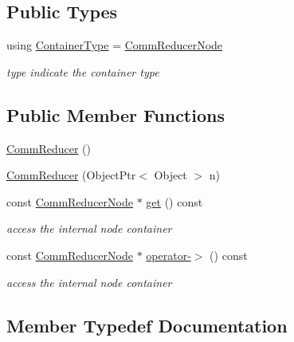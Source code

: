 \subsection*{Public Types}
\begin{DoxyCompactItemize}
\item 
using \hyperlink{classtvm_1_1tir_1_1CommReducer_af3d55a2dcd9c4ecc28145d1c5e00ec2c}{Container\+Type} = \hyperlink{classtvm_1_1tir_1_1CommReducerNode}{Comm\+Reducer\+Node}
\begin{DoxyCompactList}\small\item\em type indicate the container type \end{DoxyCompactList}\end{DoxyCompactItemize}
\subsection*{Public Member Functions}
\begin{DoxyCompactItemize}
\item 
\hyperlink{classtvm_1_1tir_1_1CommReducer_a1a1d6de9090785185ed42446a4374614}{Comm\+Reducer} ()
\item 
\hyperlink{classtvm_1_1tir_1_1CommReducer_a9af1549787e4a3971ab494c56b8fe97c}{Comm\+Reducer} (Object\+Ptr$<$ Object $>$ n)
\item 
const \hyperlink{classtvm_1_1tir_1_1CommReducerNode}{Comm\+Reducer\+Node} $\ast$ \hyperlink{classtvm_1_1tir_1_1CommReducer_a4c69b3e99208dc2b59a2d7ea9a14f98a}{get} () const 
\begin{DoxyCompactList}\small\item\em access the internal node container \end{DoxyCompactList}\item 
const \hyperlink{classtvm_1_1tir_1_1CommReducerNode}{Comm\+Reducer\+Node} $\ast$ \hyperlink{classtvm_1_1tir_1_1CommReducer_aca31665f9c784eeffed66dc38079ed4a}{operator-\/$>$} () const 
\begin{DoxyCompactList}\small\item\em access the internal node container \end{DoxyCompactList}\end{DoxyCompactItemize}


\subsection{Member Typedef Documentation}
